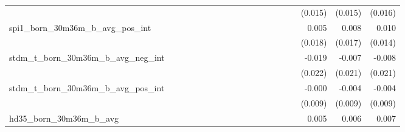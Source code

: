 \begin{tabular}{lrrrrrrrrrrrrrrrrrr}
                                            &              &              &              &              &              &              &              &              &               &              &              &               &              &              &               &      (0.015) &      (0.015) &       (0.016) \\ 
spi1\_born\_30m36m\_b\_avg\_pos\_int        &              &              &              &              &              &              &              &              &               &              &              &               &              &              &               &        0.005 &        0.008 &         0.010 \\ 
                                            &              &              &              &              &              &              &              &              &               &              &              &               &              &              &               &      (0.018) &      (0.017) &       (0.014) \\ 
stdm\_t\_born\_30m36m\_b\_avg\_neg\_int     &              &              &              &              &              &              &              &              &               &              &              &               &              &              &               &       -0.019 &       -0.007 &        -0.008 \\ 
                                            &              &              &              &              &              &              &              &              &               &              &              &               &              &              &               &      (0.022) &      (0.021) &       (0.021) \\ 
stdm\_t\_born\_30m36m\_b\_avg\_pos\_int     &              &              &              &              &              &              &              &              &               &              &              &               &              &              &               &       -0.000 &       -0.004 &        -0.004 \\ 
                                            &              &              &              &              &              &              &              &              &               &              &              &               &              &              &               &      (0.009) &      (0.009) &       (0.009) \\ 
hd35\_born\_30m36m\_b\_avg                  &              &              &              &              &              &              &              &              &               &              &              &               &              &              &               &        0.005 &        0.006 &         0.007 \\ 

\end{tabular}
